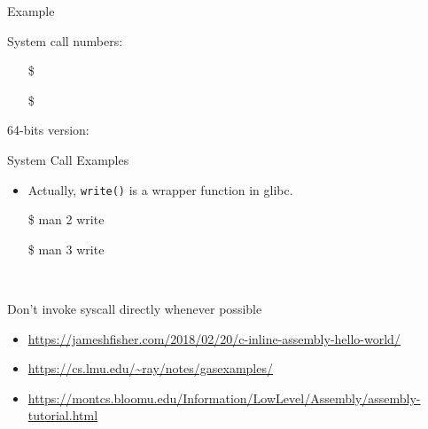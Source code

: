 \begin{frame}{Example}
  \begin{center}
  \end{center}
  System call numbers:
  \begin{itemize}
  \item[\$] 
  \item[\$] 
  \end{itemize}
\end{frame}

64-bits version:

\begin{frame}{System Call Examples}
  \begin{minipage}{.55\linewidth}
  \end{minipage}\quad
  \begin{minipage}{.4\linewidth}\ttfamily\footnotesize
    \begin{itemize}
    \item Actually, \texttt{write()} is a wrapper function in glibc.
    \item[\$] man 2 write
    \item[\$] man 3 write
    \end{itemize}
  \end{minipage}\\[1em]
  \begin{description}
  \item[Don't invoke syscall directly whenever possible]
  \end{description}
\end{frame}

\begin{itemize}
\item \url{https://jameshfisher.com/2018/02/20/c-inline-assembly-hello-world/}
\item \url{https://cs.lmu.edu/~ray/notes/gasexamples/}
\item \url{https://montcs.bloomu.edu/Information/LowLevel/Assembly/assembly-tutorial.html}
\end{itemize}

